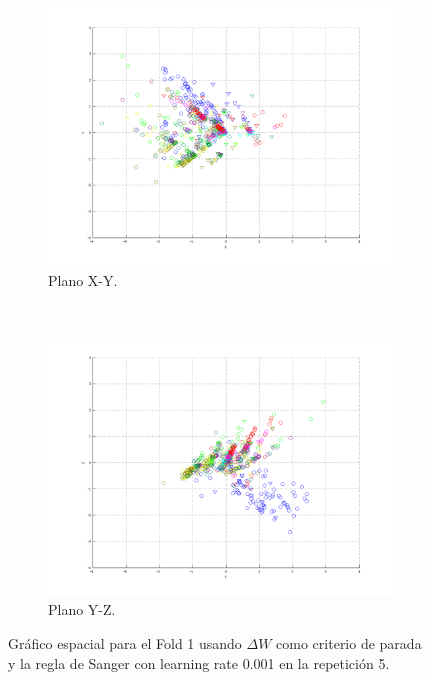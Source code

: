\documentclass[informe.tex]{subfiles}
\begin{document}
\begin{figure}[H]
        \hspace*{-6.5cm}
        \begin{subfigure}[b]{0.49\textwidth}
                \includegraphics[width=\textwidth]{graficos/fold1_criterioParadap_reglas_alpha0_rep5_2XY.png}
                \caption{Plano X-Y.}
        \end{subfigure}
        ~
        \begin{subfigure}[b]{0.49\textwidth}
                \includegraphics[width=\textwidth]{graficos/fold1_criterioParadap_reglas_alpha0_rep5_3YZ.png}
                \caption{Plano Y-Z.}
        \end{subfigure}
	\restoregeometry
        \caption{Gráfico espacial para el Fold 1 usando $\Delta W$ como criterio de parada y la regla de Sanger con learning rate 0.001 en la repetición 5.}
        \label{fig:fold1_criterioParadap_reglas_alpha0_rep5}
	\end{figure} 
 
\end{document}
